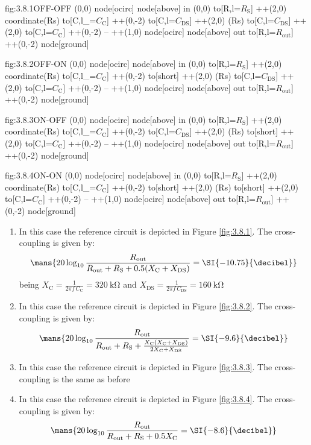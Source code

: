 \begin{circuit}{fig:3.8.1}{OFF-OFF}
    (0,0) node[ocirc] {}
    node[above] {in}
    (0,0) to[R,l=$R_\text{S}$] ++(2,0) coordinate(Rs)
    to[C,l_=$C_\text{C}$] ++(0,-2)
    to[C,l=$C_\text{DS}$] ++(2,0)
    (Rs) to[C,l=$C_\text{DS}$] ++(2,0)
    to[C,l=$C_\text{C}$] ++(0,-2) 
    -- ++(1,0)
    node[ocirc] {}
    node[above] {out}
    to[R,l=$R_\text{out}$] ++(0,-2)
    node[ground] {}
\end{circuit}
\begin{circuit}{fig:3.8.2}{OFF-ON}
    (0,0) node[ocirc] {}
    node[above] {in}
    (0,0) to[R,l=$R_\text{S}$] ++(2,0) coordinate(Rs)
    to[C,l_=$C_\text{C}$] ++(0,-2)
    to[short] ++(2,0)
    (Rs) to[C,l=$C_\text{DS}$] ++(2,0)
    to[C,l=$C_\text{C}$] ++(0,-2) 
    -- ++(1,0)
    node[ocirc] {}
    node[above] {out}
    to[R,l=$R_\text{out}$] ++(0,-2)
    node[ground] {}
\end{circuit}
\begin{circuit}{fig:3.8.3}{ON-OFF}
    (0,0) node[ocirc] {}
    node[above] {in}
    (0,0) to[R,l=$R_\text{S}$] ++(2,0) coordinate(Rs)
    to[C,l_=$C_\text{C}$] ++(0,-2)
    to[C,l=$C_\text{DS}$] ++(2,0)
    (Rs) to[short] ++(2,0)
    to[C,l=$C_\text{C}$] ++(0,-2) 
    -- ++(1,0)
    node[ocirc] {}
    node[above] {out}
    to[R,l=$R_\text{out}$] ++(0,-2)
    node[ground] {}
\end{circuit}
\begin{circuit}{fig:3.8.4}{ON-ON}
    (0,0) node[ocirc] {}
    node[above] {in}
    (0,0) to[R,l=$R_\text{S}$] ++(2,0) coordinate(Rs)
    to[C,l_=$C_\text{C}$] ++(0,-2)
    to[short] ++(2,0)
    (Rs) to[short] ++(2,0)
    to[C,l=$C_\text{C}$] ++(0,-2) 
    -- ++(1,0)
    node[ocirc] {}
    node[above] {out}
    to[R,l=$R_\text{out}$] ++(0,-2)
    node[ground] {}
\end{circuit}

\begin{enumerate}
\item In this case the reference circuit is depicted in Figure \ref{fig:3.8.1}. The cross-coupling is given by:
\[\mans{20\log_{10}\frac{R_\text{out}}{R_\text{out}+R_\text{S}+0.5(X_\text{C}+X_\text{DS})}=\SI{-10.75}{\decibel}}\]
being $X_\text{C}=\frac{1}{2\pi f\,C_\text{C}}=\SI{320}{\kilo\ohm}$ and $X_\text{DS}=\frac{1}{2\pi f\,C_\text{DS}}=\SI{160}{\kilo\ohm}$
\item In this case the reference circuit is depicted in Figure \ref{fig:3.8.2}. The cross-coupling is given by:
\[\mans{20\log_{10}\frac{R_\text{out}}{R_\text{out}+R_\text{S}+\frac{X_\text{C}(X_\text{C}+X_\text{DS})}{2X_\text{C}+X_\text{DS}}}=\SI{-9.6}{\decibel}}\]
\item In this case the reference circuit is depicted in Figure \ref{fig:3.8.3}. The cross-coupling is the same as before
\item In this case the reference circuit is depicted in Figure \ref{fig:3.8.4}. The cross-coupling is given by:
\[\mans{20\log_{10}\frac{R_\text{out}}{R_\text{out}+R_\text{S}+0.5X_\text{C}}=\SI{-8.6}{\decibel}}\]
\end{enumerate}

